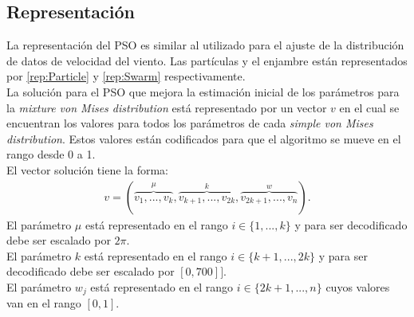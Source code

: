 \subsection{Representación}\label{sec:Representacion}
La representación del PSO es similar al utilizado para el ajuste de la distribución de datos de velocidad del viento. Las partículas y el enjambre están representados por \ref{rep:Particle} y \ref{rep:Swarm} respectivamente.\\
La solución para el PSO que mejora la estimación inicial de los parámetros para la \emph{mixture von Mises distribution} está representado por un vector $v$ en el cual se encuentran los valores para todos los parámetros de cada \emph{simple von Mises distribution}. Estos valores están codificados para que el algoritmo se mueve en el rango desde 0 a 1.\\
El vector solución tiene la forma:
\begin{align}
    v = (\overbrace{v_1,...,v_k}^{\mu},\overbrace{v_{k+1},...,v_{2k}}^{k},\overbrace{v_{2k+1},...,v_{n}}^{w}).
\end{align}
El parámetro $\mu$ está representado en el rango $i \in \{1,...,k\}$ y para ser decodificado debe ser escalado por $2\pi$.\\
El parámetro $k$ está representado en el rango $i \in \{k+1,...,2k\}$ y para ser decodificado debe ser escalado por $[0, 700]]$.\\
El parámetro $w_j$ está representado en el rango $i \in \{2k+1,...,n\}$ cuyos valores van en el rango $[0,1]$.

